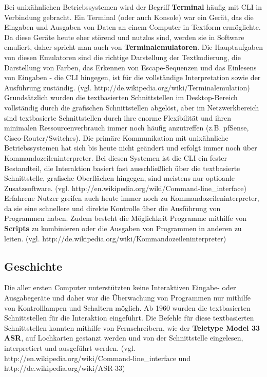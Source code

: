 \documentclass[12pt,a4paper]{report}
\begin{document}
Bei unixähnlichen Betriebssystemen wird der Begriff \textbf{Terminal} häufig mit CLI in Verbindung gebracht. Ein Terminal (oder auch Konsole) war ein Gerät, das die Eingaben und Ausgaben von Daten an einem Computer in Textform ermöglichte. Da diese Geräte heute eher störend und nutzlos sind, werden sie in Software emuliert, daher spricht man auch von \textbf{Terminalemulatoren}. Die Hauptaufgaben von diesen Emulatoren sind die richtige Darstellung der Textkodierung, die Darstellung von Farben, das Erkennen von Escape-Sequenzen und das Einlesens von Eingaben - die CLI hingegen, ist für die vollständige Interpretation sowie der Ausführung zuständig. (vgl. http://de.wikipedia.org/wiki/Terminalemulation)\\

Grundsätzlich wurden die textbasierten Schnittstellen im Desktop-Bereich vollständig durch die grafischen Schnittstellen abgelöst, aber im Netzwerkbereich sind textbasierte Schnittstellen durch ihre enorme Flexibilität und ihren minimalen Ressourcenverbrauch immer noch häufig anzutreffen (z.B. pfSense, Cisco-Router/Switches). Die primäre Kommunikation mit unixähnliche Betriebssystemen hat sich bis heute nicht geändert und erfolgt immer noch über Kommandozeileninterpreter. Bei diesen Systemen ist die CLI ein fester Bestandteil, die Interaktion basiert fast ausschließlich über die textbasierte Schnittstelle, grafische Oberflächen hingegen, sind meistens nur optioanle Zusatzsoftware. (vgl. http://en.wikipedia.org/wiki/Command-line\_interface)\\ 

Erfahrene Nutzer greifen auch heute immer noch zu Kommandozeileninterpreter, da sie eine schnellere und direkte Kontrolle über die Ausführung von Programmen haben. Zudem besteht die Möglichkeit Programme mithilfe von \textbf{Scripts} zu kombinieren oder die Ausgaben von Programmen in anderen zu leiten. (vgl. http://de.wikipedia.org/wiki/Kommandozeileninterpreter)

\subsection{Geschichte}

Die aller ersten Computer unterstützten keine Interaktiven Eingabe- oder Ausgabegeräte und daher war die Überwachung von Programmen nur mithilfe von Kontrolllampen und Schaltern möglich. Ab 1960 wurden die textbasierten Schnittstellen für die Interaktion eingeführt. Die Befehle für diese textbasierten Schnittstellen konnten mithilfe von Fernschreibern, wie der \textbf{Teletype Model 33 ASR}, auf Lochkarten gestanzt werden und von der Schnittstelle eingelesen, interpretiert und ausgeführt werden. (vgl. http://en.wikipedia.org/wiki/Command-line\_interface und http://de.wikipedia.org/wiki/ASR-33) \\
\end{document}
